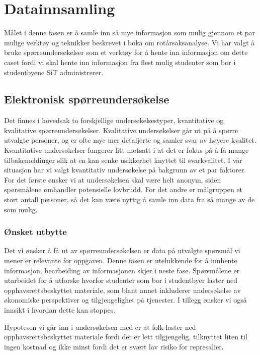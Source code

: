 \chapter{Datainnsamling}
Målet i denne fasen er å samle inn så mye informasjon som mulig gjennom et par mulige verktøy og teknikker beskrevet i boka om rotårsaksanalyse\cite{RCA}. Vi har valgt å bruke spørreundersøkelser som et verktøy for å hente inn informasjon om dette caset fordi vi skal hente inn informasjon fra flest mulig studenter som bor i studentbyene SiT administrerer.

\section{Elektronisk spørreundersøkelse}
Det finnes i hovedsak to forskjellige undersøkelsestyper, kvantitative og kvalitative spørreundersøkelser. Kvalitative undersøkelser går ut på å spørre utvalgte personer, og er ofte mye mer detaljerte og samler svar av høyere kvalitet. Kvantitative undersøkelser fungerer litt motsatt i at det er fokus på å få mange tilbakemeldinger slik at en kan senke usikkerhet knyttet til svarkvalitet. I vår situasjon har vi valgt kvantitativ undersøkelse på bakgrunn av et par faktorer. For det første ønsker vi at undersøkelsen skal være helt anonym, siden spørsmålene omhandler potensielle lovbrudd. For det andre er målgruppen et stort antall personer, så det kan være nyttig å samle inn data fra så mange av de som mulig.

\subsection{Ønsket utbytte}
Det vi ønsker å få ut av spørreundersøkelsen er data på utvalgte spørsmål vi mener er relevante for oppgaven. Denne fasen er utelukkende for å innhente informasjon, bearbeiding av informasjonen skjer i neste fase. Spørsmålene er utarbeidet for å utforske hvorfor studenter som bor i studentbyer laster ned opphavsrettsbeskyttet materiale, som blant annet inkluderer undersøkelse av økonomiske perspektiver og tilgjengelighet på tjenester. I tillegg ønsker vi også innsikt i hvordan dette kan stoppes. 

Hypotesen vi går inn i undersøkelsen med er at folk laster ned opphavsrettsbeskyttet materiale fordi det er lett tilgjengelig, tilknyttet liten til ingen kostnad og ikke minst fordi det er svært lav risiko for represalier.


